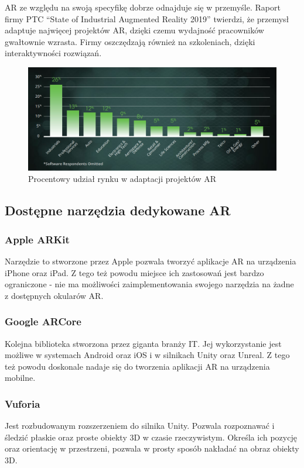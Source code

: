 \documentclass[12pt,twoside,polish]{article}
\begin{document}
AR ze względu na swoją specyfikę dobrze odnajduje się w przemyśle. Raport firmy PTC \enquote{State of Industrial Augmented Reality 2019} \cite{ptcreport} twierdzi, że przemysł adaptuje najwięcej projektów AR, dzięki czemu wydajność pracowników gwałtownie wzrasta. Firmy oszczędzają również na szkoleniach, dzięki interaktywności rozwiązań.

\begin{figure}
\centering
\includegraphics[width=\textwidth]{arbyindustry}
\caption{Procentowy udział rynku w adaptacji projektów AR}
\end{figure}

\subsection{Dostępne narzędzia dedykowane AR}
\subsubsection*{Apple ARKit}
Narzędzie to stworzone przez Apple pozwala tworzyć aplikacje AR na urządzenia iPhone oraz iPad. Z tego też powodu miejsce ich zastosowań jest bardzo ograniczone - nie ma możliwości zaimplementowania swojego narzędzia na żadne z dostępnych okularów AR.

\subsubsection*{Google ARCore}
Kolejna biblioteka stworzona przez giganta branży IT. Jej wykorzystanie jest możliwe w systemach Android oraz iOS i w silnikach Unity oraz Unreal. Z tego też powodu doskonale nadaje się do tworzenia aplikacji AR na urządzenia mobilne.

\subsubsection*{Vuforia}
Jest rozbudowanym rozszerzeniem do silnika Unity. Pozwala rozpoznawać i śledzić płaskie oraz proste obiekty 3D w czasie rzeczywistym. Określa ich pozycję oraz orientację w przestrzeni, pozwala w prosty sposób nakładać na obraz obiekty 3D.
\end{document}

